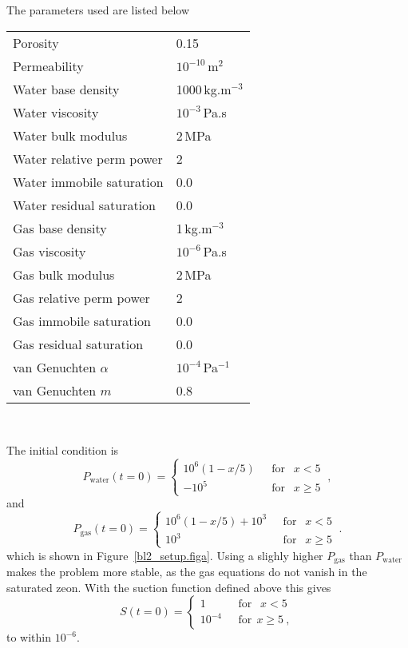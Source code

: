 \documentclass[]{scrreprt}
\begin{document}
The parameters used are listed below
\begin{center}
\begin{tabular}{|ll|}
\hline
Porosity & 0.15 \\
Permeability & $ 10^{-10}$\,m$^{2}$ \\
\hline
Water base density & 1000\,kg.m$^{-3}$ \\
Water viscosity & $10^{-3}$\,Pa.s \\
Water bulk modulus & 2\,MPa \\
Water relative perm power & 2 \\
Water immobile saturation & 0.0 \\
Water residual saturation & 0.0 \\
\hline
Gas base density & 1\,kg.m$^{-3}$ \\
Gas viscosity & $10^{-6}$\,Pa.s \\
Gas bulk modulus & 2\,MPa \\
Gas relative perm power & 2 \\
Gas immobile saturation & 0.0 \\
Gas residual saturation & 0.0 \\
\hline
van Genuchten $\alpha$ & $10^{-4}$\,Pa$^{-1}$ \\
van Genuchten $m$ & 0.8 \\
\hline
\end{tabular} \\
\end{center}


The initial condition is
\begin{equation}
P_{\mathrm{water}}(t=0) = \left\{
\begin{array}{ll}
10^{6}(1-x/5) & \ \ \ \mbox{for }\ \ x<5 \\
-10^{5} & \ \ \ \mbox{for }\ \ x\geq 5
\end{array}
\right. \ ,
\end{equation}
and
\begin{equation}
P_{\mathrm{gas}}(t=0) = \left\{
\begin{array}{ll}
10^{6}(1-x/5) + 10^{3} & \ \ \ \mbox{for }\ \ x<5 \\
10^{3} & \ \ \ \mbox{for }\ \ x\geq 5
\end{array}
\right. \ .
\end{equation}
which is shown in Figure~\ref{bl2_setup.figa}.  Using a slighly higher
$P_{\mathrm{gas}}$ than $P_{\mathrm{water}}$ makes the problem more
stable, as the gas equations do not vanish in the saturated zeon.
With the suction function defined above this gives
\begin{equation}
S(t=0) = \left\{
\begin{array}{ll}
1 & \ \ \ \mbox{for }\ \ x < 5 \\
10^{-4} & \ \ \ \mbox{for} \ \ x \geq 5  \ ,
\end{array}
\right.
\end{equation}
to within $10^{-6}$.
\end{document}
